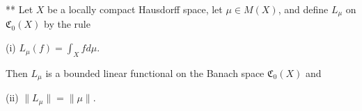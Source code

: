 ** Let $X$ be a locally compact Hausdorff space, let $\mu \in M(X)$, and define $L_\mu$ on $\mathfrak{C}_0(X)$ by the rule

(i) $L_\mu(f) = \int_X f d\mu$.

Then $L_\mu$ is a bounded linear functional on the Banach space $\mathfrak{C}_0(X)$ and

(ii) $\|L_\mu\| = \|\mu\|$.